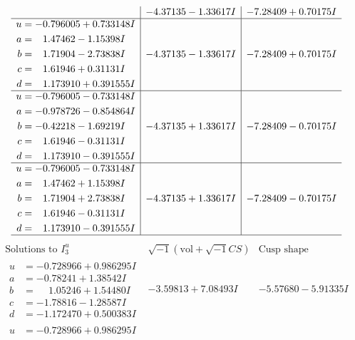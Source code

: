 \documentclass[1p]{elsarticle_modified}
\theoremstyle{definition}
\newcommand{\I}{\sqrt{-1}}
\begin{document}
$$\begin{array}{c|c|c}
 & -4.37135 - 1.33617 I & -7.28409 + 0.70175 I \\ \hline\begin{aligned}
u &= -0.796005 + 0.733148 I \\
a &= \phantom{-}1.47462 - 1.15398 I \\
b &= \phantom{-}1.71904 - 2.73838 I \\
c &= \phantom{-}1.61946 + 0.31131 I \\
d &= \phantom{-}1.173910 + 0.391555 I\end{aligned}
 & -4.37135 - 1.33617 I & -7.28409 + 0.70175 I \\ \hline\begin{aligned}
u &= -0.796005 - 0.733148 I \\
a &= -0.978726 - 0.854864 I \\
b &= -0.42218 - 1.69219 I \\
c &= \phantom{-}1.61946 - 0.31131 I \\
d &= \phantom{-}1.173910 - 0.391555 I\end{aligned}
 & -4.37135 + 1.33617 I & -7.28409 - 0.70175 I \\ \hline\begin{aligned}
u &= -0.796005 - 0.733148 I \\
a &= \phantom{-}1.47462 + 1.15398 I \\
b &= \phantom{-}1.71904 + 2.73838 I \\
c &= \phantom{-}1.61946 - 0.31131 I \\
d &= \phantom{-}1.173910 - 0.391555 I\end{aligned}
 & -4.37135 + 1.33617 I & -7.28409 - 0.70175 I\\
 \hline 
 \end{array}$$\newpage$$\begin{array}{c|c|c}  
\text{Solutions to }I^u_{3}& \I (\text{vol} + \sqrt{-1}CS) & \text{Cusp shape}\\
 \hline 
\begin{aligned}
u &= -0.728966 + 0.986295 I \\
a &= -0.78241 + 1.38542 I \\
b &= \phantom{-}1.05246 + 1.54480 I \\
c &= -1.78816 - 1.28587 I \\
d &= -1.172470 + 0.500383 I\end{aligned}
 & -3.59813 + 7.08493 I & -5.57680 - 5.91335 I \\ \hline\begin{aligned}
u &= -0.728966 + 0.986295 I \\

\end{aligned}
\end{array}$$
\end{document}
